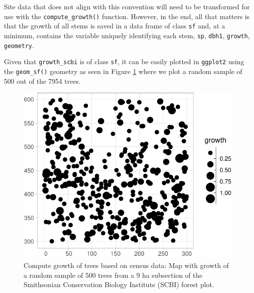 \documentclass[12pt]{article}
\newenvironment{Shaded}{\begin{snugshade}}{\end{snugshade}}
\newcommand{\DataTypeTok}[1]{\textcolor[rgb]{0.13,0.29,0.53}{#1}}
\newcommand{\DecValTok}[1]{\textcolor[rgb]{0.00,0.00,0.81}{#1}}
\newcommand{\FloatTok}[1]{\textcolor[rgb]{0.00,0.00,0.81}{#1}}
\newcommand{\KeywordTok}[1]{\textcolor[rgb]{0.13,0.29,0.53}{\textbf{#1}}}
\newcommand{\NormalTok}[1]{#1}
\newcommand{\OperatorTok}[1]{\textcolor[rgb]{0.81,0.36,0.00}{\textbf{#1}}}
\newcommand{\StringTok}[1]{\textcolor[rgb]{0.31,0.60,0.02}{#1}}
\begin{document}
Site data that does not align with this convention will need to be
transformed for use with the \texttt{compute\_growth()} function.
However, in the end, all that matters is that the growth of all stems is
saved in a data frame of class \texttt{sf} and, at a minimum, contains
the variable uniquely identifying each stem, \texttt{sp}, \texttt{dbh1},
\texttt{growth}, \texttt{geometry}.

Given that \texttt{growth\_scbi} is of class \texttt{sf}, it can be
easily plotted in \texttt{ggplot2} using the \texttt{geom\_sf()}
geometry as seen in Figure \ref{fig:scbi-trees} where we plot a random
sample of 500 out of the 7954 trees.

\begin{Shaded}
\end{Shaded}

\begin{figure}

{\centering \includegraphics[width=0.66\linewidth]{Figures/scbi-trees-1} 

}

\caption{Compute growth of trees based on census data: Map with growth of a random sample of 500 trees from a 9 ha subsection of the Smithsonian Conservation Biology Institute (SCBI) forest plot.}\label{fig:scbi-trees}
\end{figure}
\end{document}
